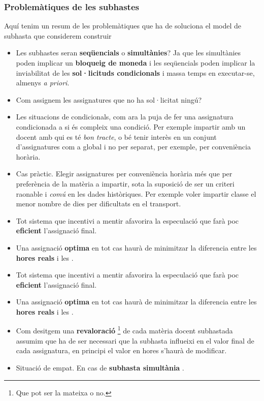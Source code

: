 \documentclass[10pt,twocolumn]{article}
\begin{document}
\subsubsection{Problemàtiques de les  subhastes}
Aquí tenim un resum de les problemàtiques que ha de soluciona el model de subhasta que considerem construir 
\begin{tcolorbox}[colback=black!1,title=\textbf{Llista problemàtiques subhastes},coltitle=black,colbacktitle=black!10]
\begin{itemize}
	\item Les subhastes seran \textbf{seqüencials} o \textbf{simultànies}? Ja que les simultànies  poden implicar un \textbf{bloqueig de moneda} i les seqüencials poden implicar la inviabilitat de les \textbf{sol·licituds condicionals} i  massa temps en executar-se, almenys \textit{ a priori}.
	\item Com assignem les assignatures que no ha sol·licitat ningú?
	\item Les situacions de condicionals, com ara la puja de fer una assignatura condicionada a si  és compleix una condició.{\color{black!70} Per exemple impartir amb un docent amb qui es té  \textit{bon tracte}, o bé tenir interès en un conjunt d'assignatures com a global i no per separat, per exemple, per conveniència horària}.
		\item Cas pràctic. Elegir assignatures per conveniència horària més  que per preferència de la matèria a impartir, sota la suposició de ser un criteri raonable i \textit{comú} en les dades històriques. {\color{black!70} Per exemple voler impartir classe el menor nombre de dies per dificultats en el transport.}
			\item Tot sistema que incentivi a mentir afavorira la especulació que farà poc \textbf{eficient} l'assignació final.
		\item Una assignació \textbf{optima} en tot cas haurà de  minimitzar la diferencia entre les \textbf{hores reals} i les . 
\end{itemize}
\end{tcolorbox}

\begin{tcolorbox}[colback=black!1]
\begin{itemize} 
	\item Tot sistema que incentivi a mentir afavorira la especulació que farà poc \textbf{eficient} l'assignació final.
	\item Una assignació \textbf{optima} en tot cas haurà de  minimitzar la diferencia entre les \textbf{hores reals} i les .
	\item Com desitgem una \textbf{revaloració} \footnote{Que pot ser la mateixa o no.} de cada matèria docent subhastada assumim que ha de ser necessari que la subhasta influeixi en el valor final de cada assignatura, en principi el valor en hores s'haurà de modificar.
	\item Situació de empat. {{\color{black!70}En cas de \textbf{subhasta simultània} .}}
\end{itemize}
\end{tcolorbox}
\end{document}
